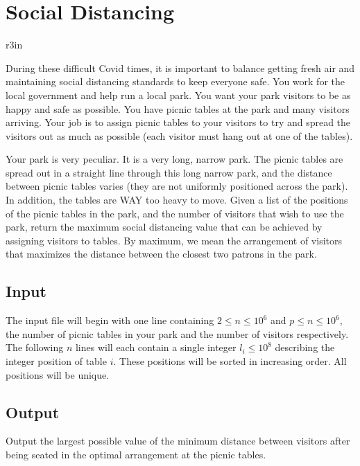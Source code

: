 \documentclass[11pt]{article}
\begin{document}
\section*{Social Distancing}


\begin{wrapfigure}{r}{3in}
\vspace{-10pt}
\vspace{-30pt}
\end{wrapfigure}

During these difficult Covid times, it is important to balance getting fresh air and maintaining social distancing standards to keep everyone safe. You work for the local government and help run a local park. You want your park visitors to be as happy and safe as possible. You have picnic tables at the park and many visitors arriving. Your job is to assign picnic tables to your visitors to try and spread the visitors out as much as possible (each visitor must hang out at one of the tables).

Your park is very peculiar. It is a very long, narrow park. The picnic tables are spread out in a straight line through this long narrow park, and the distance between picnic tables varies (they are not uniformly positioned across the park). In addition, the tables are WAY too heavy to move. Given a list of the positions of the picnic tables in the park, and the number of visitors that wish to use the park, return the maximum social distancing value that can be achieved by assigning visitors to tables. By maximum, we mean the arrangement of visitors that maximizes the distance between the closest two patrons in the park.

\subsection*{Input}
The input file will begin with one line containing $ 2 \leq n \leq 10^6$ and $p \leq n \leq 10^6$, the number of picnic tables in your park and the number of visitors respectively. The following $n$ lines will each contain a single integer $l_i \leq 10^8$ describing the integer position of table $i$. These positions will be sorted in increasing order. All positions will be unique.

\subsection*{Output}
Output the largest possible value of the minimum distance between visitors after being seated in the optimal arrangement at the picnic tables.
\end{document}
